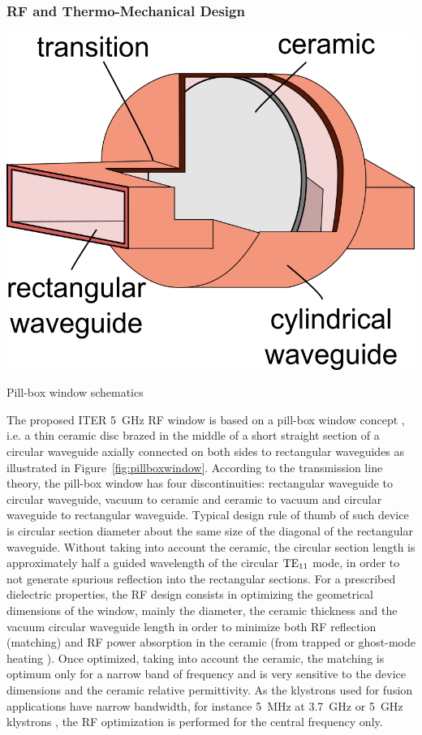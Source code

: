 \subsubsection{RF and Thermo-Mechanical Design}
\begin{marginfigure}
	\centering
	\includegraphics[width=1.0\linewidth]{figures/chap3/pillbox_window}
	\caption{Pill-box window schematics}
	\label{fig:pillboxwindow}
\end{marginfigure}

The proposed ITER 5~\si{GHz} RF window is based on a pill-box window concept , i.e. a thin ceramic disc brazed in the middle of a short straight section of a circular waveguide axially connected on both sides to rectangular waveguides as illustrated in Figure~\ref{fig:pillboxwindow}. According to the transmission line theory, the pill-box window has four discontinuities: rectangular waveguide to circular waveguide, vacuum to ceramic and ceramic to vacuum and circular waveguide to rectangular waveguide. Typical design rule of thumb of such device is circular section diameter about the same size of the diagonal of the rectangular waveguide. Without taking into account the ceramic, the circular section length is approximately half a guided wavelength of the circular ${\mathrm{TE}}_{11}$ mode, in order to not generate spurious reflection into the rectangular sections. For a prescribed dielectric properties, the RF design consists in optimizing the geometrical dimensions of the window, mainly the diameter, the ceramic thickness and the vacuum circular waveguide length in order to minimize both RF reflection (matching) and RF power absorption in the ceramic (from trapped or ghost-mode heating \cite{ives1993} ). Once optimized, taking into account the ceramic, the matching is optimum only for a narrow band of frequency and is very sensitive to the device dimensions and the ceramic relative permittivity. As the klystrons used for fusion applications have narrow bandwidth, for instance 5~MHz at 3.7~GHz  or 5~GHz klystrons , the RF optimization is performed for the central frequency only. 

